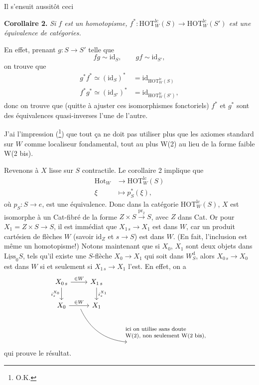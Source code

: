\documentclass[11pt]{article}
\newcommand{\printedpage}[1]{\marginpar{\footnotesize p.~#1}}
\newcommand{\msp}[1]{\marginpar{\footnotesize [#1]}}
\newcommand{\Hot}{\mathrm{Hot}}
\newcommand{\id}{\mathrm{id}}
\newcommand{\HOTlc}{\mathrm{HOT}^{\mathrm{lc}}_W}
\newcommand{\Wd}{W^{\mathrm{d}}_S}
\begin{document}
Il s'ensuit aussitôt ceci

\textbf{Corollaire 2.} \textit{Si $f$ est un homotopisme, $f^* : \HOTlc(S) \longrightarrow \HOTlc(S')$ est une équivalence de catégories.}

En effet, prenant $g : S \longrightarrow S'$ telle que
\[ fg \sim \id_S, \qquad gf \sim \id_{S'}, \]
on trouve que
\[ \begin{aligned}
g^*f^* \simeq (\id_S)^* &= \id_{\HOTlc(S)} \\
f^*g^* \simeq (\id_{S'})^* &= \id_{\HOTlc(S')},
\end{aligned} \]
donc on trouve que (quitte à ajuster ces isomorphismes fonctoriels) $f^*$ et $g^*$ sont des équivalences quasi-inverses l'une de l'autre.

J'ai l'impression (\footnote[54]{O.K.}) que tout ça ne doit pas utiliser plus que les axiomes standard sur $W$ comme localiseur fondamental, tout au plus W(2) au lieu de la forme faible W(2 bis).

Revenons à $X$ lisse sur $S$ contractile. Le corollaire 2 implique que
\[ \begin{aligned}
\Hot_W &\longrightarrow \HOTlc(S) \\
\xi &\longmapsto p^*_S(\xi),
\end{aligned} \]
où $p_S : S \longrightarrow e$, est une équivalence. Donc dans la catégorie $\HOTlc(S)$, $X$ est isomorphe \msp{page 47} à un Cat-fibré de la forme $Z \times S \xrightarrow{\mathrm{pr}_2} S$, avec $Z$ dans Cat. Or pour $X_1 = Z \times S \longrightarrow S$, il est immédiat que $X_{1\,s} \longrightarrow X_1$ est dans $W$, car un produit cartésien de flèches $W$ (savoir $\id_Z$ et $s \longrightarrow S$) est dans $W$. (En fait, l'inclusion est même un homotopisme!) Notons maintenant que si $X_0$, $X_1$ sont deux objets dans $\underline{\mathrm{Liss}}_0S$, tels qu'il existe une $S$-flèche $X_0 \longrightarrow X_1$ qui soit dans $\Wd$, alors $X_{0\,s} \longrightarrow X_0$ est dans $W$ si et seulement si $X_{1\,s} \longrightarrow X_1$ l'est. En effet, on a
\[ \begin{tikzcd}
X_{0\,s} \arrow[r, "\in W"] \arrow[d, "i_s^{X_0}"'] & X_{1\,s} \arrow[d, "i_s^{X_1}"] & \\
X_0 \arrow[r, "\in W", ""{name=A, below}] & X_1 & \\
 & & \text{\footnotesize\begin{tabular}{@{}l@{}}ici on utilise sans doute\\ W(2), non seulement W(2 bis),\end{tabular}}
\arrow[from=A, to=3-3, bend right]
\end{tikzcd} \]
\printedpage{35}
qui prouve le résultat.
\end{document}
